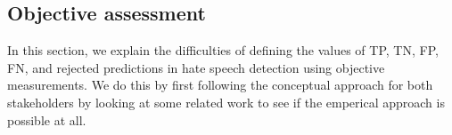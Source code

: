 



\subsection{Objective assessment}
\label{sec:objective-assessment}
%
%
%
%
%
%
%
%
%
%
%
%

In this section, we explain the difficulties of defining the values of TP, TN, FP, FN, and rejected predictions in hate speech detection using objective measurements.
%
We do this by first following the conceptual approach for both stakeholders by looking at some related work to see if the emperical approach is possible at all.
%

